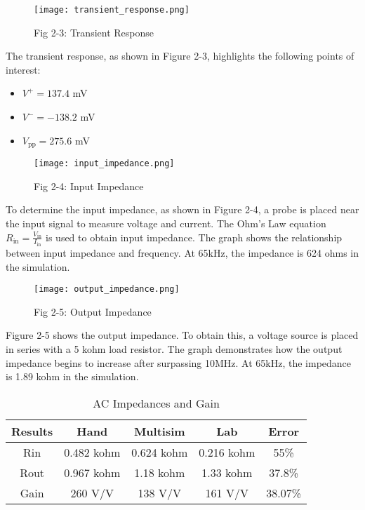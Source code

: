 \documentclass[conference]{IEEEtran}
\begin{document}
\begin{figure}[htbp]
    \centering
    \texttt{[image: transient\_response.png]}
    \caption{Fig 2-3: Transient Response}
    \label{fig:fig-2-3-transient-response}
\end{figure}

The transient response, as shown in Figure 2-3, highlights the following points of interest:
\begin{itemize}
    \item \(V^+ = 137.4\) mV
    \item \(V^- = -138.2\) mV
    \item \(V_{\text{pp}} = 275.6\) mV
\end{itemize}
\par
\vspace{12pt} %

\begin{figure}[htbp]
    \centering
    \texttt{[image: input\_impedance.png]}
    \caption{Fig 2-4: Input Impedance}
    \label{fig:input-impedance}
\end{figure}

To determine the input impedance, as shown in Figure 2-4, a probe is placed near the input signal to measure voltage and current. The Ohm's Law equation \(R_{\text{in}} = \frac{V_{\text{in}}}{I_{\text{in}}}\) is used to obtain input impedance. The graph shows the relationship between input impedance and frequency. At 65kHz, the impedance is 624 ohms in the simulation.

\begin{figure}[htbp]
    \centering
    \texttt{[image: output\_impedance.png]}
    \caption{Fig 2-5: Output Impedance}
    \label{fig:output-impedance}
\end{figure}

Figure 2-5 shows the output impedance. To obtain this, a voltage source is placed in series with a 5 kohm load resistor. The graph demonstrates how the output impedance begins to increase after surpassing 10MHz. At 65kHz, the impedance is 1.89 kohm in the simulation.

\begin{table}[htbp]
\centering
\begin{tabular}{|c|c|c|c|c|}
\hline
Results & Hand & Multisim & Lab & Error \\ \hline
Rin & 0.482 kohm & 0.624 kohm & 0.216 kohm & 55\% \\ \hline
Rout & 0.967 kohm & 1.18 kohm & 1.33 kohm & 37.8\% \\ \hline
Gain & 260 V/V & 138 V/V & 161 V/V & 38.07\% \\ \hline
\end{tabular}
\caption{AC Impedances and Gain}
\label{tab:AC-impedances-gain}
\end{table}
\end{document}
